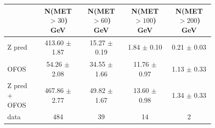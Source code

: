 \begin{figure}[hbtp]
  \begin{center}

	\medskip 

    \begin{tabular}{lcccc}
\hline
                        &   N(MET $>30$)  GeV    &   N(MET $>60$)  GeV    &   N(MET $>100$) GeV    &   N(MET $>200$) GeV \\
\hline
              Z pred    & 413.60  $\pm$  1.87    &  15.27  $\pm$  0.19    &    1.84 $\pm$  0.10    &   0.21  $\pm$  0.03 \\
                OFOS    &  54.26  $\pm$  2.08    &  34.55  $\pm$  1.66    &   11.76 $\pm$  0.97    &   1.13  $\pm$  0.33 \\
\hline
       Z pred + OFOS    & 467.86  $\pm$  2.77    &  49.82  $\pm$  1.67    &   13.60 $\pm$  0.98    &   1.34  $\pm$  0.33 \\
\hline
                   data &   484                  &    39                  &    14                  &     2 \\


\hline
    \end{tabular}

    \caption{  }
    \label{fig:pfmet_eemm}
  \end{center}
\end{figure}

